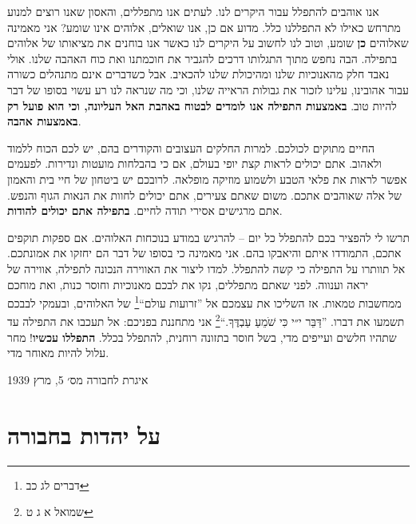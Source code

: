 \documentclass[14pt, article, extrafontsizes, twopage, a4paper]{memoir}
\newcommand{\attr}[1]{
  {\raggedright\smaller#1


  }
}
\begin{document}
אנו אוהבים להתפלל עבור היקרים לנו. לעתים אנו מתפללים, והאסון שאנו רוצים למנוע מתרחש כאילו לא התפללנו כלל. מדוע אם כן, אנו שואלים, אלוהים אינו שומע? אני מאמינה שאלוהים \textbf {כן} שומע, וטוב לנו לחשוב על היקרים לנו כאשר אנו בוחנים את מציאותו של אלוהים בתפילה. הבה נחפש מתוך התגלותו דרכים להגביר את חוכמתנו ואת כוח האהבה שלנו. אולי נאבד חלק מהאנוכיות שלנו ומהיכולת שלנו להכאיב. אבל כשדברים אינם מתנהלים כשורה עבור אהובינו, עלינו לזכור את גבולות הראייה שלנו, וכי מה שנראה לנו רע עשוי בסופו של דבר להיות טוב. \textbf{באמצעות התפילה אנו לומדים לבטוח באהבת האל העליונה, וכי הוא פועל רק באמצעות אהבה}.

החיים מתוקים לכולכם. למרות החלקים העצובים והקודרים בהם, יש לכם הכוח ללמוד ולאהוב. אתם יכולים לראות קצת יופי בעולם, אם כי בהבלחות מועטות ונדירות. לפעמים אפשר לראות את פלאי הטבע ולשמוע מוזיקה מופלאה. לרובכם יש ביטחון של חיי בית והאמון של אלה שאוהבים אתכם. משום שאתם צעירים, אתם יכולים לחוות את הנאות הגוף והנפש. אתם מרגישים אסירי תודה לחיים. \textbf{בתפילה אתם יכולים להודות}.

תרשו לי להפציר בכם להתפלל כל יום -- להרגיש במודע בנוכחות האלוהים. אם ספקות תוקפים אתכם, התמודדו איתם והיאבקו בהם. אני מאמינה כי בסופו של דבר הם יחזקו את אמונתכם. אל תוותרו על התפילה כי קשה להתפלל. למדו ליצור את האווירה הנכונה לתפילה, אווירה של יראה וענווה. לפני שאתם מתפללים, נקו את לבכם מאנוכיות וחוסר כנות, ואת מוחכם ממחשבות טמאות. אז השליכו את עצמכם אל ”זרועות עולם“\footnote{דברים לג כב} של האלוהים, ובעמקי לבבכם תשמעו את דברו. ”דַּבֵּר י״י כִּי שֹׁמֵעַ עַבְדֶּךָ.“\footnote{שמואל א ג ט} אני מתחננת בפניכם: אל תעכבו את התפילה עד שתהיו חלשים ועייפים מדי, בשל חוסר בתזונה רוחנית, להתפלל בכלל. \textbf{התפללו עכשיו}! מחר עלול להיות מאוחר מדי.

\attr{איגרת לחבורה מס׳ 5, מרץ 1939}

\chapter{על יהדות בחבורה}
\end{document}
